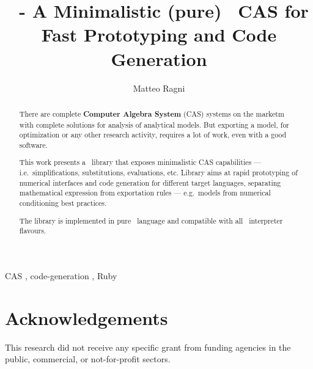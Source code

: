 \documentclass[preprint, 12pt, a4paper,review]{elsarticle}
\begin{document}
\begin{frontmatter}

\title{\ragnicas~- A Minimalistic (pure) \Ruby~CAS for Fast Prototyping and Code Generation}

\author[ragni]{Matteo Ragni}
\address[ragni]{Department of Industrial Engineering, University of Trento, 9, Sommarive, Povo di Trento, Italy}

\begin{abstract}
There are complete \textbf{Computer Algebra System} (CAS) systems on the marketm with complete solutions for analysis of analytical models. But exporting a model, for optimization or any other research activity, requires a lot of work, even with a good software.

This work presents a \Ruby~library that exposes minimalistic CAS capabilities --- i.e.\ simplifications, substitutions, evaluations, etc. Library aims at rapid prototyping of numerical interfaces and code generation for different target languages, separating mathematical expression from exportation rules --- e.g.\ models from numerical conditioning best practices.

The library is implemented in pure \Ruby~language and compatible with all \Ruby~interpreter flavours.
\end{abstract}

\begin{keyword}
CAS \sep{} code-generation \sep{} Ruby
\end{keyword}

\end{frontmatter}

\linenumbers{}








\section*{Acknowledgements}
\label{sec:acknowledgements}
This research did not receive any specific grant from funding agencies in the public, commercial, or not-for-profit sectors.






\end{document}
